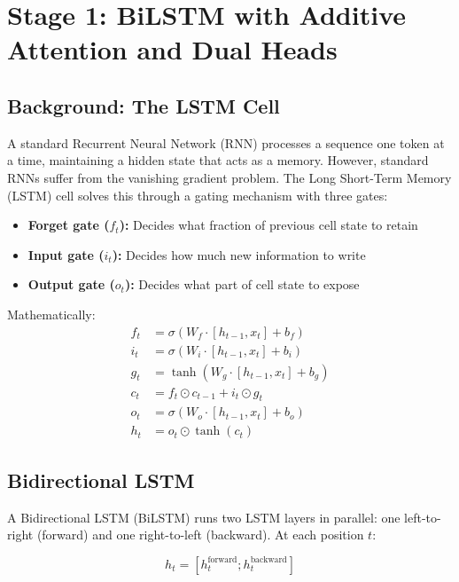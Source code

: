 \documentclass[12pt, a4paper]{report}
\begin{document}
\section{Stage 1: BiLSTM with Additive Attention and Dual Heads}

\subsection{Background: The LSTM Cell}

A standard Recurrent Neural Network (RNN) processes a sequence one token at a time, maintaining a hidden state that acts as a memory. However, standard RNNs suffer from the vanishing gradient problem. The Long Short-Term Memory (LSTM) cell \cite{hochreiter1997lstm} solves this through a gating mechanism with three gates:

\begin{itemize}
    \item \textbf{Forget gate ($f_t$):} Decides what fraction of previous cell state to retain
    \item \textbf{Input gate ($i_t$):} Decides how much new information to write
    \item \textbf{Output gate ($o_t$):} Decides what part of cell state to expose
\end{itemize}

Mathematically:
\begin{align}
    f_t &= \sigma(W_f \cdot [h_{t-1}, x_t] + b_f) \\
    i_t &= \sigma(W_i \cdot [h_{t-1}, x_t] + b_i) \\
    g_t &= \tanh(W_g \cdot [h_{t-1}, x_t] + b_g) \\
    c_t &= f_t \odot c_{t-1} + i_t \odot g_t \\
    o_t &= \sigma(W_o \cdot [h_{t-1}, x_t] + b_o) \\
    h_t &= o_t \odot \tanh(c_t)
\end{align}

\subsection{Bidirectional LSTM}

A Bidirectional LSTM (BiLSTM) runs two LSTM layers in parallel: one left-to-right (forward) and one right-to-left (backward). At each position $t$:

\begin{equation}
    h_t = [h_t^{\text{forward}} ; h_t^{\text{backward}}]
\end{equation}
\end{document}
